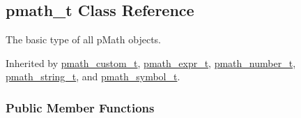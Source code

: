 \hypertarget{classpmath__t}{
\subsection{pmath\_\-t Class Reference}
\label{classpmath__t}
}
The basic type of all pMath objects.  


Inherited by \hyperlink{classpmath__custom__t}{pmath\_\-custom\_\-t}, \hyperlink{classpmath__expr__t}{pmath\_\-expr\_\-t}, \hyperlink{classpmath__number__t}{pmath\_\-number\_\-t}, \hyperlink{classpmath__string__t}{pmath\_\-string\_\-t}, and \hyperlink{classpmath__symbol__t}{pmath\_\-symbol\_\-t}.

\subsubsection*{Public Member Functions}
